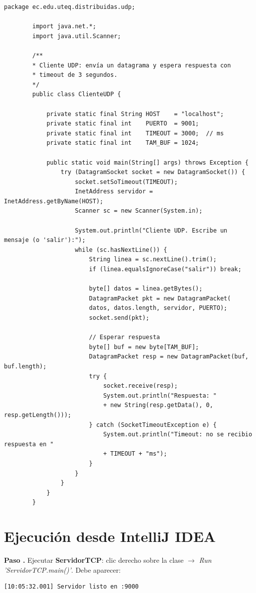 \documentclass[12pt, a4paper, openany]{book}
\newcounter{paso}[section]
\newcommand{\paso}[1]{%
	\stepcounter{paso}%
	\medskip\noindent
	\begin{tcolorbox}[enhanced, colback=white, colframe=practiceBlue,
		boxrule=0.8pt, arc=3pt, left=6pt, right=6pt, top=4pt, bottom=4pt,
		before upper={\noindent}]
		\textcolor{practiceBlue}{\textbf{Paso \arabic{paso}.}} #1
	\end{tcolorbox}%
}
\newcommand{\menu}[1]{\textit{#1}}
\begin{document}
	\begin{lstlisting}[style=JavaStyle, caption={ClienteUDP.java --- Cliente sin conexión}]
		package ec.edu.uteq.distribuidas.udp;
		
		import java.net.*;
		import java.util.Scanner;
		
		/**
		* Cliente UDP: envía un datagrama y espera respuesta con
		* timeout de 3 segundos.
		*/
		public class ClienteUDP {
			
			private static final String HOST    = "localhost";
			private static final int    PUERTO  = 9001;
			private static final int    TIMEOUT = 3000;  // ms
			private static final int    TAM_BUF = 1024;
			
			public static void main(String[] args) throws Exception {
				try (DatagramSocket socket = new DatagramSocket()) {
					socket.setSoTimeout(TIMEOUT);
					InetAddress servidor = InetAddress.getByName(HOST);
					Scanner sc = new Scanner(System.in);
					
					System.out.println("Cliente UDP. Escribe un mensaje (o 'salir'):");
					while (sc.hasNextLine()) {
						String linea = sc.nextLine().trim();
						if (linea.equalsIgnoreCase("salir")) break;
						
						byte[] datos = linea.getBytes();
						DatagramPacket pkt = new DatagramPacket(
						datos, datos.length, servidor, PUERTO);
						socket.send(pkt);
						
						// Esperar respuesta
						byte[] buf = new byte[TAM_BUF];
						DatagramPacket resp = new DatagramPacket(buf, buf.length);
						try {
							socket.receive(resp);
							System.out.println("Respuesta: "
							+ new String(resp.getData(), 0, resp.getLength()));
						} catch (SocketTimeoutException e) {
							System.out.println("Timeout: no se recibio respuesta en "
							+ TIMEOUT + "ms");
						}
					}
				}
			}
		}
	\end{lstlisting}
	
	\section{Ejecución desde IntelliJ IDEA}
	
	\paso{Ejecutar \textbf{ServidorTCP}: clic derecho sobre la clase $\to$
		\menu{Run 'ServidorTCP.main()'}. Debe aparecer:}
	
	\begin{resultadobox}
		\begin{lstlisting}[style=BashStyle]
			[10:05:32.001] Servidor listo en :9000
		\end{lstlisting}
	\end{resultadobox}
	
\end{document}

